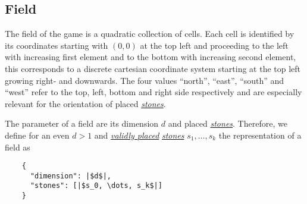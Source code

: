\documentclass{scrartcl}
\begin{document}
\subsection{Field}
\hypertarget{field}{}
The field of the game is a quadratic collection of cells. Each cell is 
identified by its coordinates starting with $(0,0)$ at the top left and 
proceeding to the left with increasing first element and to the bottom with 
increasing second element, this corresponds to a discrete cartesian coordinate 
system starting at the top left growing right- and downwards. The four values 
\enquote{north}, \enquote{east}, \enquote{south} and \enquote{west} refer to 
the top, left, bottom and right side respectively and are especially relevant 
for the orientation of placed \hyperlink{stone}{\emph{stones}}.

\begin{mdframed}[frametitle = {Representation and Illustration}]
  The parameter of a field are its dimension $d$ and placed 
  \hyperlink{stone}{\emph{stones}}. Therefore, we define for an even $d > 1$ 
  and \hyperlink{valid}{\emph{validly placed}} \hyperlink{stone}{\emph{stones}}
  $s_{1}, \dots, s_{k}$ the representation of a field as
  \begin{verbatim}
    {
      "dimension": |$d$|,
      "stones": [|$s_0, \dots, s_k$|]
    }
  \end{verbatim}
  \begin{center}
\end{center}
\end{mdframed}
\end{document}
